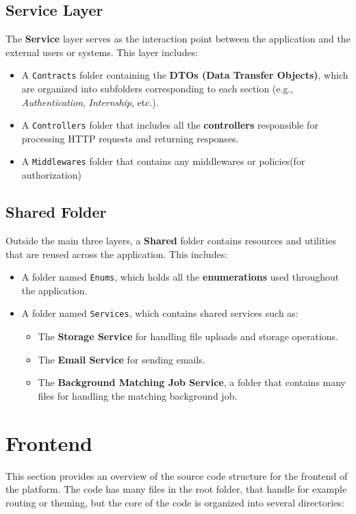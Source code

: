 \subsection{Service Layer}
The \textbf{Service} layer serves as the interaction point between the application and the external users or systems. This layer includes:

\begin{itemize}
    \item A \texttt{Contracts} folder containing the \textbf{DTOs (Data Transfer Objects)}, which are organized into subfolders corresponding to each section (e.g., \textit{Authentication}, \textit{Internship}, etc.).
    \item A \texttt{Controllers} folder that includes all the \textbf{controllers} responsible for processing HTTP requests and returning responses.
    \item A \texttt{Middlewares} folder that contains any middlewares or policies(for authorization)
\end{itemize}

\subsection{Shared Folder}
Outside the main three layers, a \textbf{Shared} folder contains resources and utilities that are reused across the application. This includes:

\begin{itemize}
    \item A folder named \texttt{Enums}, which holds all the \textbf{enumerations} used throughout the application.
    \item A folder named \texttt{Services}, which contains shared services such as:
    \begin{itemize}
        \item The \textbf{Storage Service} for handling file uploads and storage operations.
        \item The \textbf{Email Service} for sending emails.
        \item The \textbf{Background Matching Job Service}, a folder that contains many files for handling the matching background job.
    \end{itemize}
\end{itemize}


\section{Frontend}
This section provides an overview of the source code structure for the frontend of the platform. The code has many files in the root folder, that handle for example routing or theming, but the core of the code is organized into several directories:

